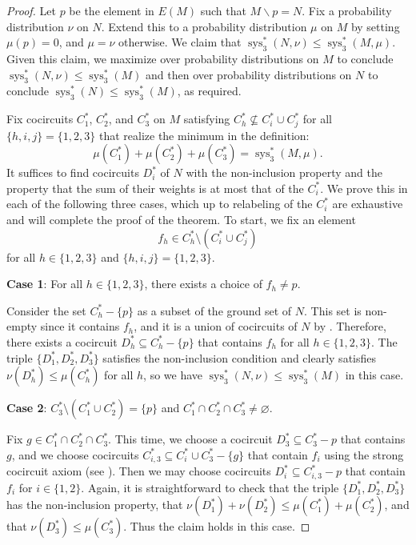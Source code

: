 \documentclass[reqno,12pt]{amsart}
\let\emptyset\varnothing
\numberwithin{theorem}{section}
\theoremstyle{plain}
\theoremstyle{definition}
\theoremstyle{remark}
\numberwithin{equation}{section}
\numberwithin{table}{section}
\DeclareMathOperator{\sys}{sys}
\begin{document}
\begin{proof}
    Let $p$ be the element in $E(M)$ such that $M\backslash p= N$. Fix a probability distribution $\nu$ on $N$. Extend this to a probability distribution $\mu$ on $M$ by setting $\mu(p) = 0$, and $\mu = \nu$ otherwise. We claim that $\sys^*_3(N, \nu) \leq \sys_3^*(M, \mu)$. Given this claim, we maximize over probability distributions on $M$ to conclude $\sys_3^*(N, \nu) \leq \sys_3^*(M)$ and then over probability distributions on $N$ to conclude $\sys_3^*(N) \leq \sys_3^*(M)$, as required.

    Fix cocircuits $C_1^*$, $C_2^*$, and $C_3^*$ on $M$ satisfying $C_h^* \not\subseteq C_i^* \cup C_j^*$ for all $\{h, i, j\} = \{1, 2, 3\}$ that realize the minimum in the definition:
        \[\mu(C_1^*) + \mu(C_2^*) + \mu(C_3^*) = \sys_3^*(M, \mu).\]
    It suffices to find cocircuits $D_i^*$ of $N$ with the non-inclusion property and the property that the sum of their weights is at most that of the $C_i^*$. We prove this in each of the following three cases, which up to relabeling of the $C_i^*$ are exhaustive and will complete the proof of the theorem. To start, we fix an element
        \[f_h \in C_h^* \setminus (C_i^* \cup C_j^*)\]
    for all $h \in \{1,2,3\}$ and $\{h, i, j\} = \{1, 2, 3\}$.

    {\bf Case 1}: For all $h \in \{1, 2, 3\}$, there exists a choice of $f_h \neq p$.

    Consider the set $C_h^* - \{p\}$ as a subset of the ground set of $N$. This set is non-empty since it contains $f_h$, and it is a union of cocircuits of $N$ by \cite[Exercise 3.1.2]{Oxley-book}. Therefore, there exists a cocircuit $D_h^* \subseteq C_h^* - \{p\}$ that contains $f_h$ for all $h \in \{1, 2, 3\}$. The triple $\{D_1^*,D_2^*,D_3^*\}$ satisfies the non-inclusion condition and clearly satisfies $\nu(D_h^*) \leq \mu(C_h^*)$ for all $h$, so we have $\sys_3^*(N, \nu) \leq \sys_3^*(M)$ in this case.

    \vspace{1em}
    {\bf Case 2}: $C_3^* \setminus (C_1^* \cup C_2^*) = \{p\}$ and $C_1^* \cap C_2^* \cap C_3^* \neq \emptyset$.

    Fix $g \in C_1^* \cap C_2^* \cap C_3^*$. This time, we choose a cocircuit $D_3^* \subseteq C_3^* - p$ that contains $g$, and we choose cocircuits $C_{i,3}^* \subseteq C_i^* \cup C_3^* - \{g\}$ that contain $f_i$ using the strong cocircuit axiom (see \cite[Exercise 1.1.14]{Oxley-book}). Then we may choose cocircuits $D_i^* \subseteq C_{i,3}^*-p$ that contain $f_i$ for $i \in \{1, 2\}$. Again, it is straightforward to check that the triple $\{D_1^*, D_2^*, D_3^*\}$ has the non-inclusion property, that $\nu(D_1^*) + \nu(D_2^*) \leq \mu(C_1^*) + \mu(C_2^*)$, and that $\nu(D_3^*) \leq \mu(C_3^*)$. Thus the claim holds in this case.


\end{proof}
\end{document}
